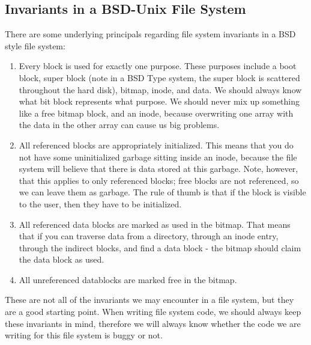 \documentclass[a4paper]{article}
\begin{document}
\subsection{Invariants in a BSD-Unix File System}
There are some underlying principals regarding file system invariants in a BSD style file system:

\begin{enumerate}
\item Every block is used for exactly one purpose. These purposes include a boot block, super block (note in a BSD Type system, the super block is scattered throughout the hard disk), bitmap, inode, and data. We should always know what bit block represents what purpose. We should never mix up something like a free bitmap block, and an inode, because overwriting one array with the data in the other array can cause us big problems. 
\item All referenced blocks are appropriately initialized. This means that you do not have some uninitialized garbage sitting inside an inode, because the file system will believe that there is data stored at this garbage. Note, however, that this applies to only referenced blocks; free blocks are not referenced, so we can leave them as garbage. The rule of thumb is that if the block is visible to the user, then they have to be initialized.
\item All referenced data blocks are marked as used in the bitmap. That means that if you can traverse data from a directory, through an inode entry, through the indirect blocks, and find a data block - the bitmap should claim the data block as used.
\item All unreferenced datablocks are marked free in the bitmap.
\end{enumerate}
These are not all of the invariants we may encounter in a file system, but they are a good starting point. When writing file system code, we should always keep these invariants in mind, therefore we will always know whether the code we are writing for this file system is buggy or not.
\end{document}
